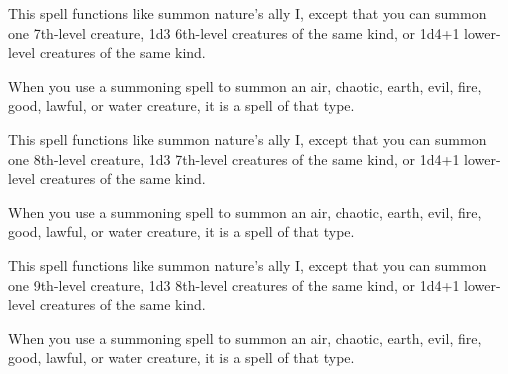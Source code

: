 \begin{multicols}{2}
\begin{small}
\noindent This spell functions like summon nature's ally I, except that you can summon one 7th-level creature, 1d3 6th-level creatures of the same kind, or 1d4+1 lower-level creatures of the same kind.

\smallskip\noindent When you use a summoning spell to summon an air, chaotic, earth, evil, fire, good, lawful, or water creature, it is a spell of that type.

\noindent This spell functions like summon nature's ally I, except that you can summon one 8th-level creature, 1d3 7th-level creatures of the same kind, or 1d4+1 lower-level creatures of the same kind.

\smallskip\noindent When you use a summoning spell to summon an air, chaotic, earth, evil, fire, good, lawful, or water creature, it is a spell of that type.

\noindent This spell functions like summon nature's ally I, except that you can summon one 9th-level creature, 1d3 8th-level creatures of the same kind, or 1d4+1 lower-level creatures of the same kind.

\smallskip\noindent When you use a summoning spell to summon an air, chaotic, earth, evil, fire, good, lawful, or water creature, it is a spell of that type.


\end{small}
\end{multicols}
